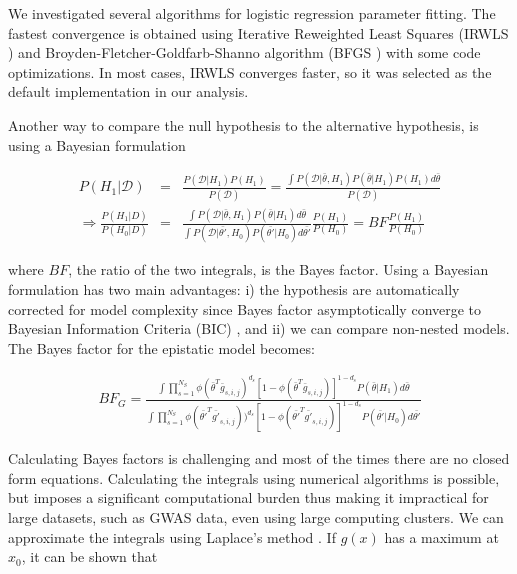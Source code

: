 We investigated several algorithms for logistic regression parameter fitting. The fastest convergence is obtained using Iterative Reweighted Least Squares (IRWLS \cite{daubechies2010iteratively}) and Broyden-Fletcher-Goldfarb-Shanno algorithm (BFGS \cite{broyden1970convergence}) with some code optimizations. In most cases, IRWLS converges faster, so it was selected as the default implementation in our analysis.

Another way to compare the null hypothesis to the alternative hypothesis, is using a Bayesian formulation \cite{kass1995bayes, wakefield2009bayes}

\begin{eqnarray*}
	P(H_1 | \mathcal{D}) & = & \frac{ P( \mathcal{D} | H_1) P(H_1) }{ P(\mathcal{D}) } = \frac{ \int{ P(\mathcal{D} | \bar{\theta} , H_1) P( \bar{\theta} | H_1) P(H_1)  d\bar{\theta} } }{ P(\mathcal{D}) }  \\
	\Rightarrow  \frac{ P(H_1 | D)  }{ P(H_0 | D)  } & = & \frac{ \int{ P(\mathcal{D} | \bar{\theta} , H_1) P( \bar{\theta} | H_1)  d\bar{\theta} } }{\int{ P(\mathcal{D} | \bar{\theta'} , H_0 ) P( \bar{\theta'} | H_0)  d\bar{\theta'} } } \frac{ P(H_1) }{ P(H_0)  }  
	=  BF \frac{ P(H_1) }{ P(H_0)  }
\end{eqnarray*}

\noindent where $BF$, the ratio of the two integrals, is the Bayes factor. Using a Bayesian formulation has two main advantages: i) the hypothesis are automatically corrected for model complexity since Bayes factor asymptotically converge to Bayesian Information Criteria (BIC) \cite{kass1995bayes}, and ii) we can compare non-nested models. The Bayes factor for the epistatic model becomes:

\begin{eqnarray}\label{eq:bf2}
	BF_G = \frac
	{ \int{ \prod_{s=1}^{N_S}{ \phi( \bar{\theta}^T \bar{g}_{s,i,j})^{d_s} [ 1-\phi( \bar{\theta}^T \bar{g}_{s,i,j}) ]^{1-d_s} } P( \bar{\theta} | H_1)  d\bar{\theta} } }
	{ \int{ \prod_{s=1}^{N_S}{ 
	\phi( \bar{\theta'}^T \bar{g'}_{s,i,j} ) )^{d_s} 
	[ 1-\phi( \bar{\theta'}^T \bar{g'}_{s,i,j}) ]^{1-d_s} } 
	P( \bar{\theta'} | H_0)  
	d\bar{\theta'} } }
\end{eqnarray}

Calculating Bayes factors is challenging and most of the times there are no closed form equations. Calculating the integrals using numerical algorithms is possible, but  imposes a significant computational burden thus making it impractical for large datasets, such as GWAS data, even using large computing clusters. We can approximate the integrals using Laplace's method  \cite{kass1995bayes}. If $g(x)$ has a maximum at $x_0$, it can be shown that

